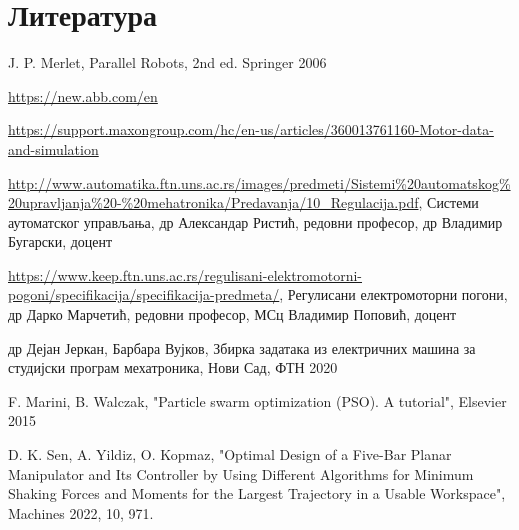 \documentclass[12pt]{article}
\begin{document}
\newpage
\section{Литература}
\begin{enumerate}[start=1,label={[\arabic*]}]
\item J. P. Merlet, Parallel Robots, 2nd ed. Springer 2006
\item \url{https://new.abb.com/en}
\item \url{https://support.maxongroup.com/hc/en-us/articles/360013761160-Motor-data-and-simulation}
\item \url{http://www.automatika.ftn.uns.ac.rs/images/predmeti/Sistemi%20automatskog%20upravljanja%20-%20mehatronika/Predavanja/10_Regulacija.pdf}, Системи аутоматског управљања,
др Александар Ристић, редовни професор, др Владимир Бугарски, доцент
\item \url{https://www.keep.ftn.uns.ac.rs/regulisani-elektromotorni-pogoni/specifikacija/specifikacija-predmeta/}, Регулисани електромоторни погони, др Дарко Марчетић, редовни професор, МСц Владимир Поповић, доцент
\item др Дејан Јеркан, Барбара Вујков, Збирка задатака из електричних машина за студијски програм мехатроника, Нови Сад, ФТН 2020
\item F. Marini, B. Walczak, "Particle swarm optimization (PSO). A tutorial", Elsevier 2015
\item D. K. Sen, A. Yildiz, O. Kopmaz, "Optimal Design of a Five-Bar Planar Manipulator and Its
Controller by Using Different Algorithms for Minimum
Shaking Forces and Moments for the Largest Trajectory in a
Usable Workspace", Machines 2022, 10, 971.
\end{enumerate}
\end{document}
